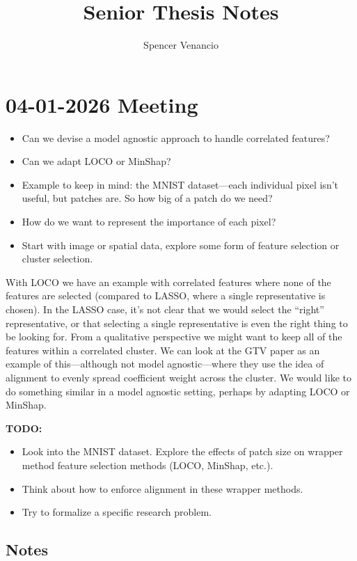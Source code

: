 \documentclass{article}
\title{Senior Thesis Notes}
\author{Spencer Venancio}
\date{}
\begin{document}
\maketitle

\section{04-01-2026 Meeting}
\begin{itemize}
    \item Can we devise a model agnostic approach to handle correlated features?
    \item Can we adapt LOCO or MinShap?
    \item Example to keep in mind: the MNIST dataset---each individual pixel isn't useful, but patches are. So how big of a patch do we need?
    \item How do we want to represent the importance of each pixel?
    \item Start with image or spatial data, explore some form of feature selection or cluster selection.
\end{itemize}

With LOCO we have an example with correlated features where none of the features are selected (compared to LASSO, where a single representative is chosen). In the LASSO case, it's not clear that we would select the ``right'' representative, or that selecting a single representative is even the right thing to be looking for. From a qualitative perspective we might want to keep all of the features within a correlated cluster. We can look at the GTV paper as an example of this---although not model agnostic---where they use the idea of alignment to evenly spread coefficient weight across the cluster. We would like to do something similar in a model agnostic setting, perhaps by adapting LOCO or MinShap.

{\color{red} \textbf{TODO:}
\begin{itemize}
    \item Look into the MNIST dataset. Explore the effects of patch size on wrapper method feature selection methods (LOCO, MinShap, etc.).
    \item Think about how to enforce alignment in these wrapper methods.
    \item Try to formalize a specific research problem.
\end{itemize}}

\subsection{Notes}
\end{document}
